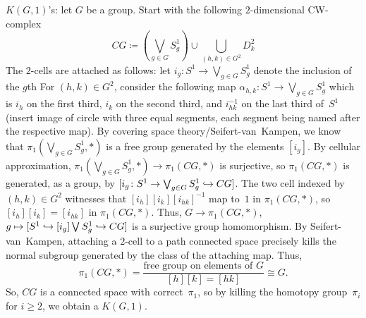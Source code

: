 \documentclass[language=english]{TemplateLecture}
\begin{document}
\(K(G,1)\)'s: let \(G\) be a group.
Start with the following \(2\)-dimensional CW-complex
\begin{equation*}
    CG \coloneq
    \left({\bigvee_{g \in G} S_g^1}\right) \cup \bigcup_{(h,k) \in G^2} D_k^2
\end{equation*}
The \(2\)-cells are attached as follows: let \(i_g \colon S^1 \to \bigvee_{g \in G} S_g^1\) denote the inclusion of the \(g\)th 
For \((h,k) \in G^2\), consider the following map \(\alpha_{h,k} \colon S^1 \to \bigvee_{g \in G} S_g^1\) which is \(i_h\) on the first third, \(i_k\) on the second third, and \(i_{hk}^{-1}\) on the last third of~\(S^1\) (insert image of circle with three equal segments, each segment being named after the respective map).
By covering space theory\slash Seifert-van~Kampen, we know that \(\pi_1(\bigvee_{g \in G} S_g^1, *)\) is a free group generated by the elements \([i_g]\).
By cellular approximation, \(\pi_1(\bigvee_{g \in G} S_g^1, *) \to \pi_1(CG, *)\) is surjective, so \(\pi_1(CG, *)\) is generated, as a group, by \([i_g \colon S^1 \to \bigvee_{g \in G} S_g^1 \hookrightarrow CG]\).
The two cell indexed by \((h,k) \in G^2\) witnesses that \([i_h] [i_k] [i_{hk}]^{-1}\) map to~\(1\) in \(\pi_1(CG, *)\), so \([i_h] [i_k] = [i_{hk}]\) in \(\pi_1(CG, *)\).
Thus, \(G \to \pi_1(CG, *)\), \(g \mapsto [S^1 \hookrightarrow[i_g] \bigvee_{} S_g^1 \hookrightarrow CG]\) is a surjective group homomorphism.
By Seifert-van~Kampen, attaching a \(2\)-cell to a path connected space precisely kills the normal subgroup generated by the class of the attaching map.
Thus,
\begin{equation*}
    \pi_1(CG,*)
    = \frac{\text{free group on elements of } G}{{[h] [k] = [hk]}}
    \cong G.
\end{equation*}
So, \(CG\) is a connected space with correct~\(\pi_1\), so by killing the homotopy group~\(\pi_i\) for \(i \ge 2\), we obtain a \(K(G,1)\).
\end{document}
